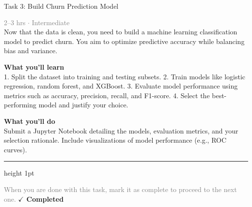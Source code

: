 \documentclass[10pt,a4paper]{article}
\begin{document}
\begin{taskbox}{Task 3: Build Churn Prediction Model}

    {\small \textcolor{gray}{2--3 hrs $\cdot$ Intermediate}}\\[12pt]

      
Now that the data is clean, you need to build a machine learning classification model to predict churn. You aim to optimize predictive accuracy while balancing bias and variance.


\vspace{8pt}
{\large \textbf{\textcolor{brandLight}{What you'll learn}}}\\[4pt]  
1. Split the dataset into training and testing subsets.  
2. Train models like logistic regression, random forest, and XGBoost.  
3. Evaluate model performance using metrics such as accuracy, precision, recall, and F1-score.  
4. Select the best-performing model and justify your choice.  

\vspace{8pt}
{\large \textbf{\textcolor{brandLight}{What you'll do}}}\\[4pt]  
Submit a Jupyter Notebook detailing the models, evaluation metrics, and your selection rationale. Include visualizations of model performance (e.g., ROC curves).\par

    \vspace{16pt}

    \textcolor{cardBorder}{\hrule height 1pt}\vspace{8pt}

    \small \textcolor{gray}{When you are done with this task, mark it as complete to proceed to the next one.} \hfill \textbf{\textcolor{brandDark}{$\checkmark$ Completed}}

\end{taskbox}
\end{document}

